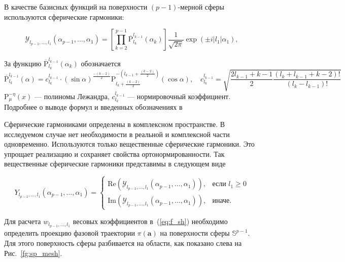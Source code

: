 \documentclass[12pt,twoside]{article}
\begin{document}
В качестве базисных функций на поверхности $(p-1)$-мерной сферы используются сферические гармоники:

\begin{equation}
	\mathcal{Y}_{l_{p-1},...,l_1}(\alpha_{p-1},\dots,\alpha_1) = 
	\left[
	    \prod\limits_{k = 2}^{p-1}
	    {\overline{\text{P}}}_{l_k}^{l_{k-1}}(\alpha_k)
	\right]
	    \frac{1}{\sqrt{2\pi}}
	    \exp{(\pm i |l_1| \alpha_1)},
\label{eq:YlN}
\end{equation}

За функцию ${\overline{\text{P}}}_{l_k}^{l_{k-1}}(\alpha_k)$ обозначается  
\[
{\overline{\text{P}}}_{l_k}^{l_{k-1}}(\alpha) =
   c^{l_{k-1}}_{l_k} \cdot (\sin \alpha)^{\frac{-(k-2)}{2}}
   \text{P}^{-(l_{k-1}+\frac{(k-2)}{2})}_{l_k+\frac{(k-2)}{2}}(\cos \alpha),
   \quad
   c^{l_{k-1}}_{l_k} = 
        \sqrt{
	        \frac{2l_{k-1}+k-1}{2}
	        \frac{(l_k+l_{k-1}+k-2)!}{(l_k-l_{k-1})!}
	    }
\]
 $\text{P}_{\mu}^{-\eta}(x)$ --- полиномы Лежандра, $c^{l_{k-1}}_{l_k}$ --- нормировочный коэффициент.
Подробнее о выводе формул и введенных обозначениях в 

Сферические гармониками определены в комплексном пространстве.
В исследуемом случае нет необходимости в реальной и комплексной части одновременно.
Используются только вещественные сферические гармоники.
Это упрощает реализацию и сохраняет свойства ортонормированности.
Так вещественные сферические гармоники представимы в следующем виде

\begin{equation}
	Y_{l_{p-1},...,l_1}(\alpha_{p-1},\dots,\alpha_1) = \begin{cases}
	\text{Re}(\mathcal{Y}_{l_{p-1},...,l_1}(\alpha_{p-1},\dots,\alpha_1)), & \mbox{если } l_1 \geq 0\\
    \text{Im}(\mathcal{Y}_{l_{p-1},...,l_1}(\alpha_{p-1},\dots,\alpha_1)), & \mbox{иначе}.
    \end{cases}
\label{eq:RTY}
\end{equation}

Для расчета $w_{l_{p-1},...,l_1}$ весовых коэффициентов в~(\ref{eq:f_sh}) необходимо определить проекцию фазовой траектории $\pi(\mathbf{a})$ на поверхности сферы $\mathbb{S}^{p-1}$.
Для этого поверхность сферы разбивается на области, как показано слева на Рис.~\ref{fg:sp_mesh}.
\end{document}
